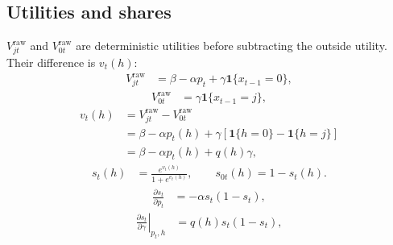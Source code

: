 \documentclass[11pt]{article}
\newcommand{\ind}{\mathbf{1}}
\begin{document}
\subsection{Utilities and shares}
$V_{jt}^{\mathrm{raw}}$ and $V_{0t}^{\mathrm{raw}}$ are deterministic utilities
before subtracting the outside utility. Their difference is $v_t(h)$:
\begin{equation}
\begin{aligned}
V_{jt}^{\mathrm{raw}}&=\beta-\alpha p_t+\gamma\ind\{x_{t-1}=0\},
\end{aligned}
\end{equation}
\begin{equation}
\begin{aligned}
V_{0t}^{\mathrm{raw}}&=\gamma\ind\{x_{t-1}=j\},
\end{aligned}
\end{equation}
\begin{equation}
\begin{aligned}
v_t(h)&=V_{jt}^{\mathrm{raw}}-V_{0t}^{\mathrm{raw}}\\[3pt]
&=\beta-\alpha p_t(h)+\gamma[\ind\{h=0\}-\ind\{h=j\}]\\[3pt]
&=\beta-\alpha p_t(h)+q(h)\gamma,
\end{aligned}
\end{equation}
\begin{equation}
\begin{aligned}
s_t(h)&=\frac{e^{v_t(h)}}{1+e^{v_t(h)}},\qquad s_{0t}(h)=1-s_t(h).
\end{aligned}
\end{equation}
\begin{equation}
\begin{aligned}
\frac{\partial s_t}{\partial p_t}&=-\alpha s_t(1-s_t),
\end{aligned}
\end{equation}
\begin{equation}
\begin{aligned}
\left.\frac{\partial s_t}{\partial\gamma}\right|_{p_t,h}&=q(h)s_t(1-s_t),
\end{aligned}
\end{equation}
\end{document}

